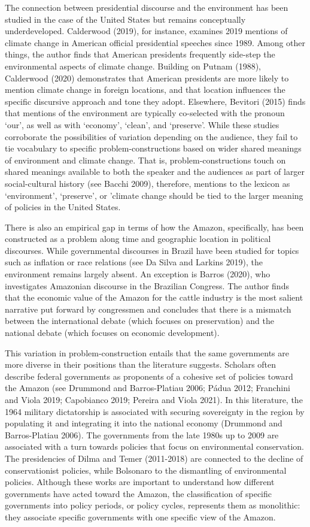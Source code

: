 \documentclass[
  12pt,
]{article}
\begin{document}
The connection between presidential discourse and the environment has
been studied in the case of the United States but remains conceptually
underdeveloped. Calderwood (2019), for instance, examines 2019 mentions
of climate change in American official presidential speeches since 1989.
Among other things, the author finds that American presidents frequently
side-step the environmental aspects of climate change. Building on
Putnam (1988), Calderwood (2020) demonstrates that American presidents
are more likely to mention climate change in foreign locations, and that
location influences the specific discursive approach and tone they
adopt. Elsewhere, Bevitori (2015) finds that mentions of the environment
are typically co-selected with the pronoun `our', as well as with
`economy', `clean', and `preserve'. While these studies corroborate the
possibilities of variation depending on the audience, they fail to tie
vocabulary to specific problem-constructions based on wider shared
meanings of environment and climate change. That is,
problem-constructions touch on shared meanings available to both the
speaker and the audiences as part of larger social-cultural history (see
Bacchi 2009), therefore, mentions to the lexicon as `environment',
`preserve', or 'climate change should be tied to the larger meaning of
policies in the United States.

There is also an empirical gap in terms of how the Amazon, specifically,
has been constructed as a problem along time and geographic location in
political discourses. While governmental discourses in Brazil have been
studied for topics such as inflation or race relations (see Da Silva and
Larkins 2019), the environment remains largely absent. An exception is
Barros (2020), who investigates Amazonian discourse in the Brazilian
Congress. The author finds that the economic value of the Amazon for the
cattle industry is the most salient narrative put forward by congressmen
and concludes that there is a mismatch between the international debate
(which focuses on preservation) and the national debate (which focuses
on economic development).

This variation in problem-construction entails that the same governments
are more diverse in their positions than the literature suggests.
Scholars often describe federal governments as proponents of a cohesive
set of policies toward the Amazon (see Drummond and Barros-Platiau 2006;
Pádua 2012; Franchini and Viola 2019; Capobianco 2019; Pereira and Viola
2021). In this literature, the 1964 military dictatorship is associated
with securing sovereignty in the region by populating it and integrating
it into the national economy (Drummond and Barros-Platiau 2006). The
governments from the late 1980s up to 2009 are associated with a turn
towards policies that focus on environmental conservation. The
presidencies of Dilma and Temer (2011-2018) are connected to the decline
of conservationist policies, while Bolsonaro to the dismantling of
environmental policies. Although these works are important to understand
how different governments have acted toward the Amazon, the
classification of specific governments into policy periods, or policy
cycles, represents them as monolithic: they associate specific
governments with one specific view of the Amazon.
\end{document}
